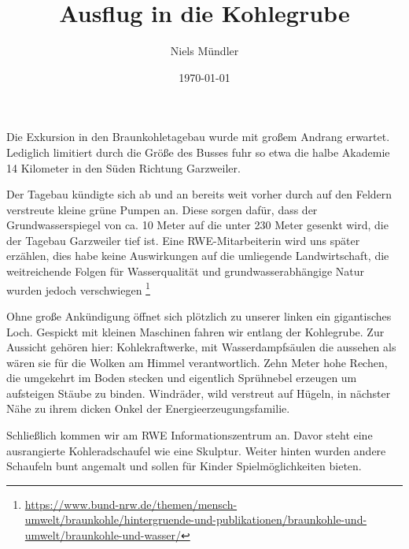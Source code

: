\documentclass{article}
\title{Ausflug in die Kohlegrube}
\author{Niels Mündler}
\date{\today}
\begin{document}
\maketitle

Die Exkursion in den Braunkohletagebau wurde mit großem Andrang erwartet.
Lediglich limitiert durch die Größe des Busses fuhr so etwa die halbe Akademie 14 Kilometer in den Süden Richtung Garzweiler.

Der Tagebau kündigte sich ab und an bereits weit vorher durch auf den Feldern verstreute kleine grüne Pumpen an.
Diese sorgen dafür, dass der Grundwasserspiegel von ca. 10 Meter auf die unter 230 Meter gesenkt wird, die der Tagebau Garzweiler tief ist.
Eine RWE-Mitarbeiterin wird uns später erzählen, dies habe keine Auswirkungen auf die umliegende Landwirtschaft, die weitreichende Folgen für Wasserqualität und grundwasserabhängige Natur wurden jedoch verschwiegen
\footnote{\url{https://www.bund-nrw.de/themen/mensch-umwelt/braunkohle/hintergruende-und-publikationen/braunkohle-und-umwelt/braunkohle-und-wasser/}}

Ohne große Ankündigung öffnet sich plötzlich zu unserer linken ein gigantisches Loch.
Gespickt mit kleinen Maschinen fahren wir entlang der Kohlegrube.
Zur Aussicht gehören hier: Kohlekraftwerke, mit Wasserdampfsäulen die aussehen als wären sie für die Wolken am Himmel verantwortlich.
Zehn Meter hohe Rechen, die umgekehrt im Boden stecken und eigentlich Sprühnebel erzeugen um aufsteigen Stäube zu binden.
Windräder, wild verstreut auf Hügeln, in nächster Nähe zu ihrem dicken Onkel der Energieerzeugungsfamilie.

Schließlich kommen wir am RWE Informationszentrum an.
Davor steht eine ausrangierte Kohleradschaufel wie eine Skulptur.
Weiter hinten wurden andere Schaufeln bunt angemalt und sollen für Kinder Spielmöglichkeiten bieten.
\end{document}
